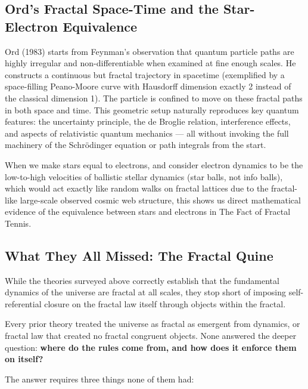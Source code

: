 \documentclass[11pt,a4paper]{article}
\begin{document}
\subsection{Ord's Fractal Space-Time and the Star-Electron Equivalence}

Ord (1983) starts from Feynman's observation that quantum particle paths are
highly irregular and non-differentiable when examined at fine enough scales. He
constructs a continuous but fractal trajectory in spacetime (exemplified by a
space-filling Peano-Moore curve with Hausdorff dimension exactly 2 instead of the
classical dimension 1). The particle is confined to move on these fractal paths in
both space and time. This geometric setup naturally reproduces key quantum features:
the uncertainty principle, the de Broglie relation, interference effects, and aspects
of relativistic quantum mechanics --- all without invoking the full machinery of the
Schr\"odinger equation or path integrals from the start.

When we make stars equal to electrons, and consider electron dynamics to be the
low-to-high velocities of ballistic stellar dynamics (star balls, not info balls),
which would act exactly like random walks on fractal lattices due to the fractal-like
large-scale observed cosmic web structure, this shows us direct mathematical evidence
of the equivalence between stars and electrons in The Fact of Fractal Tennis.

\subsection{What They All Missed: The Fractal Quine}


While the theories surveyed above correctly establish that the fundamental dynamics
of the universe are fractal at all scales, they stop short of imposing
self-referential closure on the fractal law itself through objects within the fractal.

Every prior theory treated the universe as fractal as emergent from dynamics, or
fractal law that created no fractal congruent objects. None answered the deeper
question: \textbf{where do the rules come from, and how does it enforce them on
itself?}

The answer requires three things none of them had:
\end{document}
